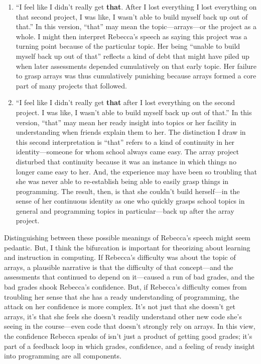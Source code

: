 \begin{enumerate}
\def\labelenumi{\arabic{enumi}.}
\item
  ``I feel like I didn't really get \textbf{that}. After I lost
  everything I lost everything on that second project, I was like, I
  wasn't able to build myself back up out of that.'' In this version,
  ``that'' may mean the topic---arrays---or the project as a whole. I
  might then interpret Rebecca's speech as saying this project was a
  turning point because of the particular topic. Her being ``unable to
  build myself back up out of that'' reflects a kind of debt that might
  have piled up when later assessments depended cumulatively on that
  early topic. Her failure to grasp arrays was thus cumulatively
  punishing because arrays formed a core part of many projects that
  followed.
\item
  ``I feel like I didn't really get \textbf{that} after I lost
  everything on the second project. I was like, I wasn't able to build
  myself back up out of that.'' In this version, ``that'' may mean her
  ready insight into topics or her facility in understanding when
  friends explain them to her. The distinction I draw in this second
  interpretation is ``that'' refers to a kind of continuity in her
  identity---someone for whom school always came easy. The array project
  disturbed that continuity because it was an instance in which things
  no longer came easy to her. And, the experience may have been so
  troubling that she was never able to re-establish being able to easily
  grasp things in programming. The result, then, is that she couldn't
  build herself---in the sense of her continuous identity as one who
  quickly grasps school topics in general and programming topics in
  particular---back up after the array project.
\end{enumerate}

Distinguishing between these possible meanings of Rebecca's speech might
seem pedantic. But, I think the bifurcation is important for theorizing
about learning and instruction in computing. If Rebecca's difficulty was
about the topic of arrays, a plausible narrative is that the difficulty
of that concept---and the assessments that continued to depend on
it---caused a run of bad grades, and the bad grades shook Rebecca's
confidence. But, if Rebecca's difficulty comes from troubling her sense
that she has a ready understanding of programming, the attack on her
confidence is more complex. It's not just that she doesn't get arrays,
it's that she feels she doesn't readily understand other new code she's
seeing in the course---even code that doesn't strongly rely on arrays.
In this view, the confidence Rebecca speaks of isn't just a product of
getting good grades; it's part of a feedback loop in which grades,
confidence, and a feeling of ready insight into programming are all
components.

